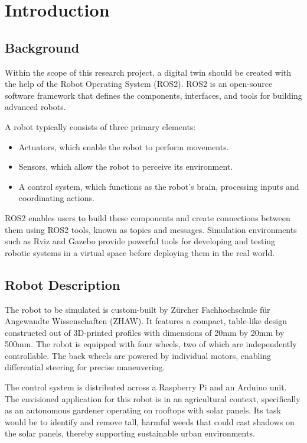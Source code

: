 \chapter{Introduction}

\section{Background}
Within the scope of this research project, a digital twin should be created with the help of the Robot Operating System (ROS2). ROS2 is an open-source software framework that defines the components, interfaces, and tools for building advanced robots. 

A robot typically consists of three primary elements:
\begin{itemize}
    \item Actuators, which enable the robot to perform movements.
    \item Sensors, which allow the robot to perceive its environment.
    \item A control system, which functions as the robot's brain, processing inputs and coordinating actions.
\end{itemize}

ROS2 enables users to build these components and create connections between them using ROS2 tools, known as topics and messages. Simulation environments such as Rviz and Gazebo provide powerful tools for developing and testing robotic systems in a virtual space before deploying them in the real world.

\section{Robot Description}
The robot to be simulated is custom-built by Zürcher Fachhochschule für Angewandte Wissenschaften (ZHAW). It features a compact, table-like design constructed out of 3D-printed profiles with dimensions of 20mm by 20mm by 500mm. The robot is equipped with four wheels, two of which are independently controllable. The back wheels are powered by individual motors, enabling differential steering for precise maneuvering. 

The control system is distributed across a Raspberry Pi and an Arduino unit. The envisioned application for this robot is in an agricultural context, specifically as an autonomous gardener operating on rooftops with solar panels. Its task would be to identify and remove tall, harmful weeds that could cast shadows on the solar panels, thereby supporting sustainable urban environments.

